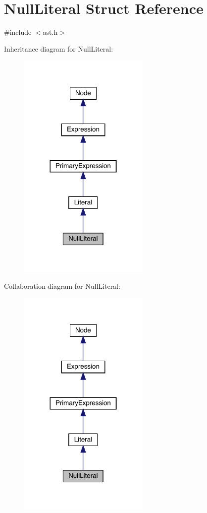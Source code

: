 \hypertarget{struct_null_literal}{}\section{Null\+Literal Struct Reference}
\label{struct_null_literal}


{\ttfamily \#include $<$ast.\+h$>$}



Inheritance diagram for Null\+Literal\+:\nopagebreak
\begin{figure}[H]
\begin{center}
\leavevmode
\includegraphics[width=180pt]{struct_null_literal__inherit__graph}
\end{center}
\end{figure}


Collaboration diagram for Null\+Literal\+:\nopagebreak
\begin{figure}[H]
\begin{center}
\leavevmode
\includegraphics[width=180pt]{struct_null_literal__coll__graph}
\end{center}
\end{figure}
